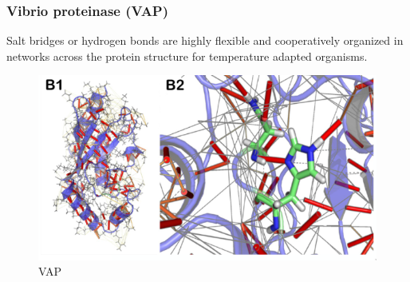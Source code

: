 		\subsubsection{Vibrio proteinase (VAP)}
		Salt bridges or hydrogen bonds are highly flexible and cooperatively organized in networks across the protein structure for temperature adapted organisms.

		\begin{figure}[H]
			\includegraphics[width=\textwidth]{vap}
			\caption{VAP}
			\label{fig:vap}
		\end{figure}
